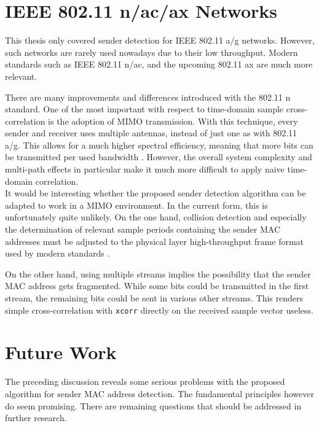 
\section{IEEE 802.11 n/ac/ax Networks}\label{sec:mimo}

This thesis only covered sender detection for IEEE 802.11 a/g networks. However, such networks are rarely used nowadays due to their low throughput. Modern standards such as IEEE 802.11 n/ac, and the upcoming 802.11 ax are much more relevant.

There are many improvements and differences introduced with the 802.11 n standard. One of the most important with respect to time-domain sample cross-correlation is the adoption of \gls{MIMO} transmission. With this technique, every sender and receiver uses multiple antennas, instead of just one as with 802.11 a/g. This allows for a much higher spectral efficiency, meaning that more bits can be transmitted per used bandwidth \cite{ieee2012}. However, the overall system complexity and multi-path effects in particular make it much more difficult to apply naive time-domain correlation.\\

It would be interesting whether the proposed sender detection algorithm can be adapted to work in a \gls{MIMO} environment. In the current form, this is unfortunately quite unlikely. On the one hand, collision detection and especially the determination of relevant sample periods containing the sender MAC addresses must be adjusted to the physical layer high-throughput frame format used by modern standards \cite{ieee2012}.

On the other hand, using multiple streams implies the possibility that the sender MAC address gets fragmented. While some bits could be transmitted in the first stream, the remaining bits could be sent in various other streams. This renders simple cross-correlation with \texttt{xcorr} directly on the received sample vector useless.



\section{Future Work}

The preceding discussion reveals some serious problems with the proposed algorithm for sender MAC address detection. The fundamental principles however do seem promising. There are remaining questions that should be addressed in further research.\\

